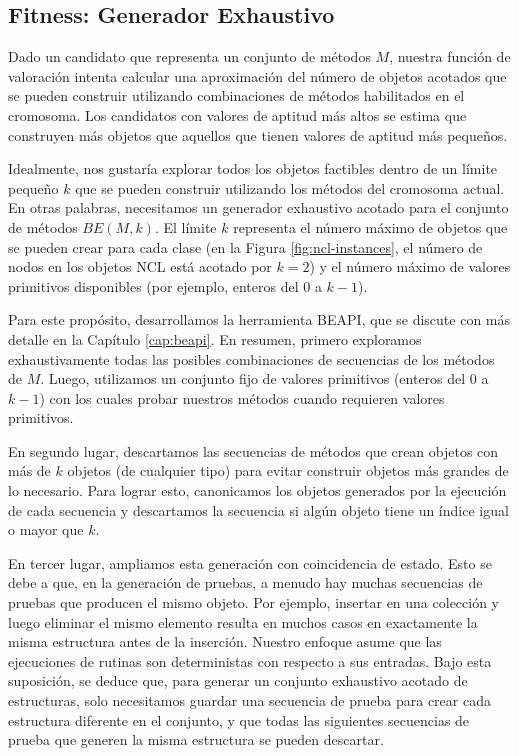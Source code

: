 \subsection{Fitness: Generador Exhaustivo}

Dado un candidato que representa un conjunto de métodos $M$, nuestra función de valoración intenta calcular una aproximación del número de objetos acotados que se pueden construir utilizando combinaciones de métodos habilitados en el cromosoma. Los candidatos con valores de aptitud más altos se estima que construyen más objetos que aquellos que tienen valores de aptitud más pequeños.

Idealmente, nos gustaría explorar todos los objetos factibles dentro de un límite pequeño $k$ que se pueden construir utilizando los métodos del cromosoma actual. En otras palabras, necesitamos un generador exhaustivo acotado para el conjunto de métodos $BE(M, k)$. El límite $k$ representa el número máximo de objetos que se pueden crear para cada clase (en la Figura \ref{fig:ncl-instances}, el número de nodos en los objetos NCL está acotado por $k=2$) y el número máximo de valores primitivos disponibles (por ejemplo, enteros del 0 a $k-1$).

Para este propósito, desarrollamos la herramienta BEAPI, que se discute con más detalle en la Capítulo \ref{cap:beapi}. En resumen, primero exploramos exhaustivamente todas las posibles combinaciones de secuencias de los métodos de $M$. Luego, utilizamos un conjunto fijo de valores primitivos (enteros del 0 a $k-1$) con los cuales probar nuestros métodos cuando requieren valores primitivos.

En segundo lugar, descartamos las secuencias de métodos que crean objetos con más de $k$ objetos (de cualquier tipo) para evitar construir objetos más grandes de lo necesario. Para lograr esto, canonicamos los objetos generados por la ejecución de cada secuencia y descartamos la secuencia si algún objeto tiene un índice igual o mayor que $k$.

En tercer lugar, ampliamos esta generación con coincidencia de estado. Esto se debe a que, en la generación de pruebas, a menudo hay muchas secuencias de pruebas que producen el mismo objeto. Por ejemplo, insertar en una colección y luego eliminar el mismo elemento resulta en muchos casos en exactamente la misma estructura antes de la inserción. Nuestro enfoque asume que las ejecuciones de rutinas son deterministas con respecto a sus entradas. Bajo esta suposición, se deduce que, para generar un conjunto exhaustivo acotado de estructuras, solo necesitamos guardar una secuencia de prueba para crear cada estructura diferente en el conjunto, y que todas las siguientes secuencias de prueba que generen la misma estructura se pueden descartar.

